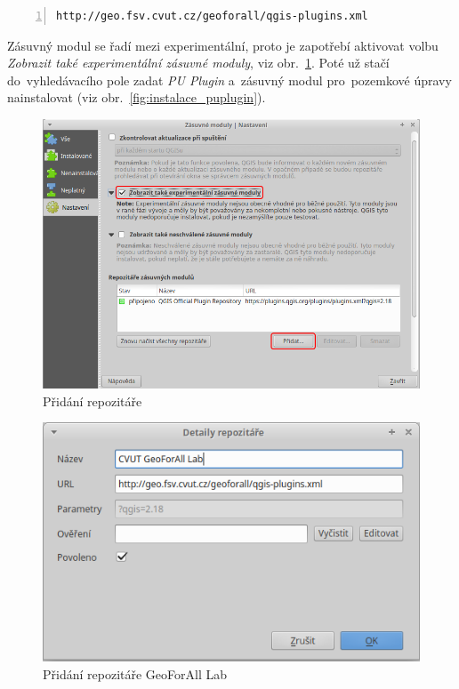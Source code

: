 \begin{lstlisting}[basicstyle=\footnotesize\ttfamily, backgroundcolor = \color{light-gray},  numbers=left]
http://geo.fsv.cvut.cz/geoforall/qgis-plugins.xml
\end{lstlisting}

Zásuvný modul se řadí mezi experimentální, proto je zapotřebí aktivovat volbu \textit{Zobrazit také experimentální zásuvné moduly}, viz obr.~\ref{fig:pridani_repozitare}. Poté už stačí do~vyhledávacího pole zadat \textit{PU Plugin} a~zásuvný modul pro~pozemkové úpravy nainstalovat (viz obr.~\ref{fig:instalace_puplugin}).

	\begin{figure}[H]
		\centering
		\includegraphics[width=.9\textwidth]{./pictures/pridani_repozitare.png}
		\caption[Přidání repozitáře]{Přidání repozitáře}
		\label{fig:pridani_repozitare}
 	\end{figure}
 	
	\begin{figure}[H]
		\centering
		\includegraphics[width=.6\textwidth]{./pictures/pridani_repozitare-geoforall_lab.png}
		\caption[Přidání repozitáře GeoForAll Lab]{Přidání repozitáře GeoForAll Lab}
		\label{fig:pridani_repozitare_geoforall_lab}
 	\end{figure}

